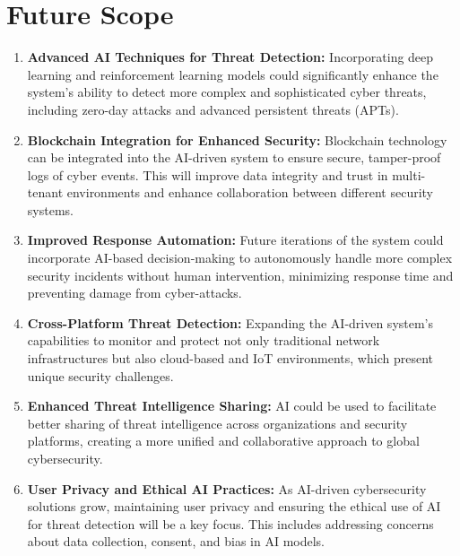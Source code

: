 \documentclass[oneside,a4paper,12pt]{report}
\begin{document}
\section*{Future Scope}
\begin{enumerate}
    \setlength{\parskip}{1.5\baselineskip}
    
    \item \textbf{Advanced AI Techniques for Threat Detection:} Incorporating deep learning and reinforcement learning models could significantly enhance the system’s ability to detect more complex and sophisticated cyber threats, including zero-day attacks and advanced persistent threats (APTs).
    
    \item \textbf{Blockchain Integration for Enhanced Security:} Blockchain technology can be integrated into the AI-driven system to ensure secure, tamper-proof logs of cyber events. This will improve data integrity and trust in multi-tenant environments and enhance collaboration between different security systems.
    
    \item \textbf{Improved Response Automation:} Future iterations of the system could incorporate AI-based decision-making to autonomously handle more complex security incidents without human intervention, minimizing response time and preventing damage from cyber-attacks.
    
    \item \textbf{Cross-Platform Threat Detection:} Expanding the AI-driven system’s capabilities to monitor and protect not only traditional network infrastructures but also cloud-based and IoT environments, which present unique security challenges.
    
    \item \textbf{Enhanced Threat Intelligence Sharing:} AI could be used to facilitate better sharing of threat intelligence across organizations and security platforms, creating a more unified and collaborative approach to global cybersecurity.
    
    \item \textbf{User Privacy and Ethical AI Practices:} As AI-driven cybersecurity solutions grow, maintaining user privacy and ensuring the ethical use of AI for threat detection will be a key focus. This includes addressing concerns about data collection, consent, and bias in AI models.
    
\end{enumerate}
\end{document}
